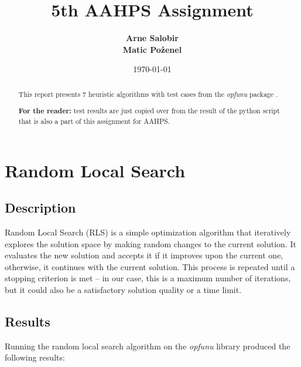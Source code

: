 \documentclass{article}
\title{\LARGE \textbf{5th AAHPS Assignment}}
\author{
  \textbf{Arne Salobir} \\
  \textbf{Matic Poženel} \\
}
\date{\today}
\begin{document}
\maketitle

\begin{abstract}
  This report presents 7 heuristic algorithms with test cases
  from the \textit{opfunu} package \cite{opfunu}.

  \textbf{For the reader:} test results are just copied over from the
  result of the python script that is also a part of this assignment for AAHPS.
\end{abstract}

\tableofcontents

\section{Random Local Search}

\subsection{Description}

Random Local Search (RLS) is a simple optimization algorithm that
iteratively explores the solution space by making random changes to
the current solution. It evaluates the new solution and accepts it if
it improves upon the current one, otherwise, it continues with the
current solution. This process is repeated until a stopping criterion
is met -- in our case, this is a maximum number of iterations, but it
could also be a satisfactory solution quality or a time limit.

\subsection{Results}

Running the random local search algorithm on the \textit{opfunu} library
produced the following results:
\end{document}
